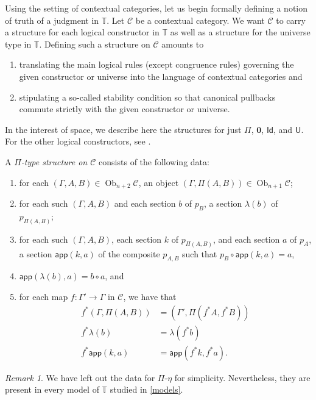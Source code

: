 \documentclass[10pt,letterpaper,cm]{nupset}
\theoremstyle{definition}
\theoremstyle{theorem}
\theoremstyle{remark}
\newtheorem{remark}[definition]{Remark}
\DeclareMathOperator{\ob}{Ob}
\newcommand{\id}{\mathsf{Id}}
\newcommand{\app}{\mathsf{app}}
\newcommand{\U}{\mathsf{U}}
\newcommand{\0}{\mathbf{0}}
\newcommand{\1}{\mathbf{1}}
\newcommand{\2}{\mathbf{2}}
\renewcommand{\c}{\mathscr{C}}
\newcommand{\T}{\mathbb T}
\newcommand{\be}{\begin{enumerate}}
\newcommand{\ee}{\end{enumerate}}
\begin{document}
\smallskip

Using the setting of contextual categories, let us begin formally defining a notion of truth of a judgment in $\T$. Let $\c$ be a contextual category. We want $\c$ to carry a structure for each logical constructor in $\T$ as well as a structure for the universe type in $\T$. Defining such a structure on $\c$ amounts to 
\be[label=(\alph*)] 
\item translating the main logical rules (except congruence rules) governing the given constructor or universe into the language of contextual categories and
\item stipulating a so-called stability condition so that  canonical pullbacks commute strictly with the given constructor or universe.
\ee In the interest of space, we describe here the structures for just $\Pi$, $\0$, $\id$, and $\U$. For the other logical constructors, see \cite[Appendix B]{KL}.  

\medskip

A \textit{$\Pi$-type structure on $\c$} consists of the following data:\label{pitype}
\be[label=(\roman*)]
\item for each $\left(\Gamma, A, B\right) \in \ob_{n+2}{\c}$, an object $\left(\Gamma, \Pi(A, B)\right)\in \ob_{n+1}{\c}$;  
\item for each such $\left(\Gamma, A, B\right)$ and each section $b$ of $p_B$, a section $\lambda(b)$ of $p_{\Pi(A, B)}$;
\item for each such $\left(\Gamma, A, B\right)$, each section $k$ of $p_{ \Pi(A, B)}$, and each section $a$ of $p_A$, a section $\app(k,a)$ of the composite $p_{A,B}$ such that $p_B \circ \app(k,a)=a$,
\item $\app(\lambda(b), a)=b\circ a$, and
\item for each map $f: \Gamma' \to \Gamma$ in $\c$, we have that
\begin{align*}
f^{\ast}(\Gamma, \Pi(A,B)) & = \left(\Gamma', \Pi(f^{\ast}{A}, f^{\ast}{B})\right)
\\ f^{\ast}\lambda(b) & = \lambda(f^{\ast}{b})
\\ f^{\ast}\app(k,a) & = \app(f^{\ast}{k}, f^{\ast}{a}).
\end{align*}
\ee

\begin{remark}
We have left out the data for $\Pi$-$\eta$ for simplicity. Nevertheless, they are present in every model of $\T$ studied in \cref{models}.
\end{remark}

\medskip
\end{document}
